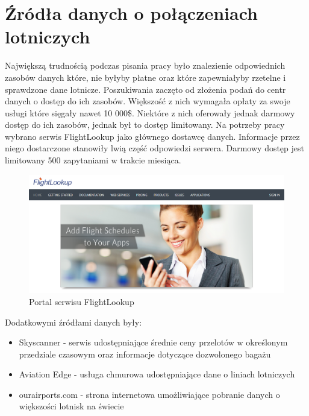 \documentclass[12pt, twoside]{report}
\begin{document}
\section{Źródła danych o połączeniach lotniczych}
Największą trudnością podczas pisania pracy było znalezienie odpowiednich zasobów danych które, nie byłyby płatne oraz które zapewniałyby rzetelne i sprawdzone dane lotnicze. Poszukiwania zaczęto od złożenia podań do centr danych o dostęp do ich zasobów. Większość z nich wymagała opłaty za swoje usługi które sięgały nawet 10 000\$. Niektóre z nich oferowały jednak darmowy dostęp do ich zasobów, jednak był to dostęp limitowany. Na potrzeby pracy wybrano serwis FlightLookup jako głównego dostawcę danych. Informacje przez niego dostarczone stanowiły lwią część odpowiedzi serwera. Darmowy dostęp jest limitowany 500 zapytaniami w trakcie miesiąca.
\vspace{1.0cm}
\begin{figure}[!ht]
\centering
\includegraphics[scale=0.50, keepaspectratio]{flightlookup.png}
\caption{Portal serwisu FlightLookup}
\label{fig:flightlookup}
\end{figure}
\newpage
Dodatkowymi źródłami danych były:
\begin{itemize}[noitemsep,topsep=0pt]
\item Skyscanner - serwis udostępniające średnie ceny przelotów w określonym przedziale czasowym oraz informacje dotyczące dozwolonego bagażu
\item Aviation Edge - usługa chmurowa udostępniające dane o liniach lotniczych 
\item ourairports.com - strona internetowa umożliwiające pobranie danych o większości lotnisk na świecie
\end{itemize}
\end{document}
